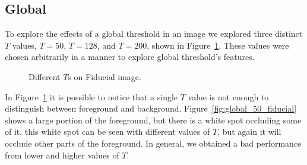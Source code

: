 \documentclass[conference]{IEEEtran}
\begin{document}
\subsection{Global}
To explore the effects of a global threshold in an image we explored three distinct $T$ values, $T = 50$, $T = 128$, and $T = 200$, shown in Figure~\ref{fig:global_fiducial}. These values were chosen arbitrarily in a manner to explore global threshold's features.
\begin{figure}[htbp]
	\centering
	\quad
	\caption{Different $T$s on Fiducial image.}
	\label{fig:global_fiducial}
\end{figure}
In Figure~\ref{fig:global_fiducial} it is possible to notice that a single $T$ value is not enough to distinguish between foreground and background. Figure~\ref{fig:global_50_fiducial} shows a large portion of the foreground, but there is a white spot occluding some of it, this white spot can be seen with different values of $T$, but again it will occlude other parts of the foreground. In general, we obtained a bad performance from lower and higher values of $T$.\par
\end{document}
